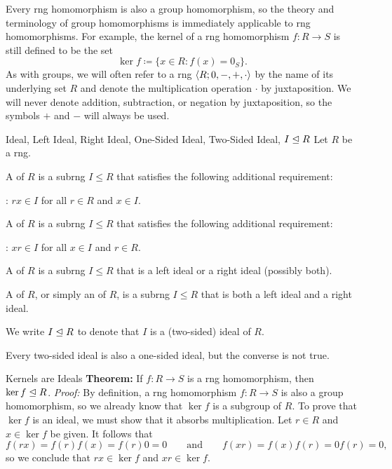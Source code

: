 Every rng homomorphism is also a group homomorphism, so the theory and terminology of group homomorphisms is immediately applicable to rng homomorphisms. For example, the kernel of a rng homomorphism $f: R \to S$ is still defined to be the set
\[ \ker f \coloneq \{ x \in R : f(x) = 0_S \}. \]
As with groups, we will often refer to a rng ${\langle {R; 0, -, +, \cdot} \rangle}$ by the name of its underlying set $R$ and denote the multiplication operation $\cdot$ by juxtaposition. We will never denote addition, subtraction, or negation by juxtaposition, so the symbols $+$ and $-$ will always be used.

\begin{dfnbox}{Ideal, Left Ideal, Right Ideal, One-Sided Ideal, Two-Sided Ideal, $I \trianglelefteq R$}
	Let $R$ be a rng.
	\begin{dfnitems}
		\item A  of $R$ is a subrng $I \le R$ that satisfies the following additional requirement:
		\begin{dfnitems}
			\item {}: $rx \in I$ for all $r \in R$ and $x \in I$.
		\end{dfnitems}
		\item A  of $R$ is a subrng $I \le R$ that satisfies the following additional requirement:
		\begin{dfnitems}
			\item {}: $xr \in I$ for all $x \in I$ and $r \in R$.
		\end{dfnitems}
		\item A  of $R$ is a subrng $I \le R$ that is a left ideal or a right ideal (possibly both).
		\item A  of $R$, or simply an  of $R$, is a subrng $I \le R$ that is both a left ideal and a right ideal.
	\end{dfnitems}
	We write $I \trianglelefteq R$ to denote that $I$ is a (two-sided) ideal of $R$.
\end{dfnbox}

Every two-sided ideal is also a one-sided ideal, but the converse is not true.

\begin{thmbox}{Kernels are Ideals}
	\textbf{Theorem:} If $f: R \to S$ is a rng homomorphism, then $\ker f \trianglelefteq R$.
	\tcblower
	\textit{Proof:} By definition, a rng homomorphism $f: R \to S$ is also a group homomorphism, so we already know that $\ker f$ is a subgroup of $R$. To prove that $\ker f$ is an ideal, we must show that it absorbs multiplication. Let $r \in R$ and $x \in \ker f$ be given. It follows that
	\[ f(rx) = f(r)f(x) = f(r)0 = 0
	\qquad \text{and} \qquad
	f(xr) = f(x)f(r) = 0f(r) = 0, \]
	so we conclude that $rx \in \ker f$ and $xr \in \ker f$.
\end{thmbox}


